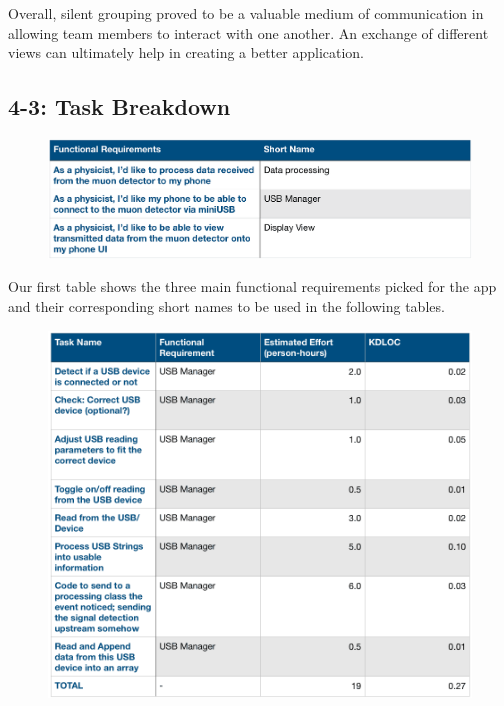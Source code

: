 \documentclass[11pt,a4paper]{article}
\begin{document}
Overall, silent grouping  proved to be a valuable medium of communication in allowing team members to interact with one another. An exchange of different views can ultimately help in creating a better application. 


\newpage
\subsection*{4-3: Task Breakdown}

\begin{figure}[h]
  \centering
      \includegraphics[width=1\textwidth]{table1.png}  
\end{figure}

Our first table shows the three main functional requirements picked for the app and their corresponding short names to be used in the following tables.

\begin{figure}[h]
  \centering
      \includegraphics[width=1.0\textwidth]{USBMtable3.png}  
\end{figure}
\end{document}
